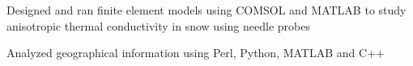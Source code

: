 \begin{job}

  \item Designed and ran finite element models using COMSOL and MATLAB to study
  anisotropic thermal conductivity in snow using needle probes
  \item Analyzed geographical information using Perl, Python, MATLAB and C++
\end{job}
